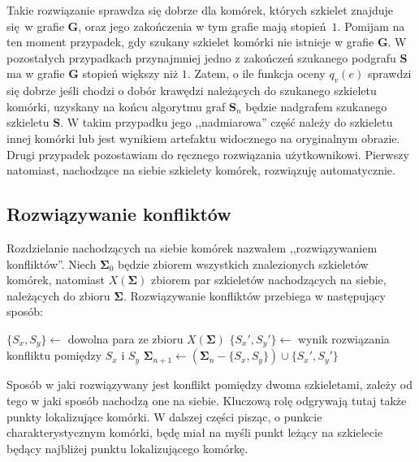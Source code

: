 \documentclass[declaration,shortabstract,mgr]{iithesis}
\begin{document}
Takie rozwiązanie sprawdza się dobrze dla komórek, których szkielet znajduje się w grafie $\mathbf{G}$, oraz jego zakończenia w tym grafie mają stopień $1$. Pomijam na ten moment przypadek, gdy szukany szkielet komórki nie istnieje w grafie $\mathbf{G}$. W pozostałych przypadkach przynajmniej jedno z zakończeń szukanego podgrafu $\mathbf{S}$ ma w grafie $\mathbf{G}$ stopień większy niż $1$. Zatem, o ile funkcja oceny $q_v(e)$ sprawdzi się dobrze jeśli chodzi o dobór krawędzi należących do szukanego szkieletu komórki, uzyskany na końcu algorytmu graf $\mathbf{S}_n$ będzie nadgrafem szukanego szkieletu $\mathbf{S}$. W takim przypadku jego ,,nadmiarowa'' część należy do szkieletu innej komórki lub jest wynikiem artefaktu widocznego na oryginalnym obrazie. Drugi przypadek pozostawiam do ręcznego rozwiązania użytkownikowi. Pierwszy natomiast, nachodzące na siebie szkielety komórek, rozwiązuję automatycznie.

\subsection{Rozwiązywanie konfliktów}
\label{sec:fix-conflicts}

Rozdzielanie nachodzących na siebie komórek nazwałem ,,rozwiązywaniem konfliktów''. Niech $\mathbf{\Sigma}_0$ będzie zbiorem wszystkich znalezionych szkieletów komórek, natomiast $X(\mathbf{\Sigma})$ zbiorem par szkieletów nachodzących na siebie, należących do zbioru $\mathbf{\Sigma}$. Rozwiązywanie konfliktów przebiega w następujący sposób:

\begin{algorithm}[H]
\begin{algorithmic}

  \STATE $\{S_x, S_y\} \gets$ dowolna para ze zbioru $X(\mathbf{\Sigma})$
  \STATE $\{S_x', S_y'\} \gets$ wynik rozwiązania konfliktu pomiędzy $S_x$ i $S_y$
  \STATE $\mathbf{\Sigma}_{n+1} \gets (\mathbf{\Sigma}_n - \{S_x, S_y\}) \cup \{S_x', S_y'\}$
\ENDWHILE

\end{algorithmic}
\end{algorithm}

Sposób w jaki rozwiązywany jest konflikt pomiędzy dwoma szkieletami, zależy od tego w jaki sposób nachodzą one na siebie. Kluczową rolę odgrywają tutaj także punkty lokalizujące komórki. W dalszej części pisząc, o punkcie charakterystycznym komórki, będę miał na myśli punkt leżący na szkielecie będący najbliżej punktu lokalizującego komórkę.
\end{document}
